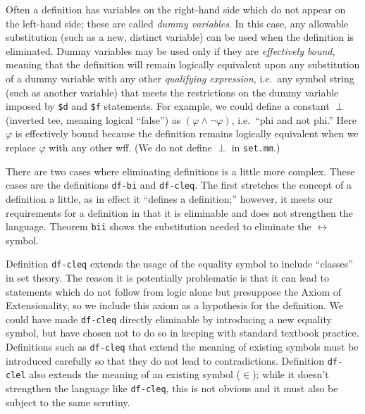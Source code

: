 Often a definition has variables on the right-hand side which do not appear on
the left-hand side; these are called {\em dummy variables}.  In this case, any
allowable substitution (such as a new, distinct
variable) can be used when the definition is eliminated.  Dummy variables may
be used only if they are {\em effectively bound}, meaning that the definition will remain logically equivalent upon
any substitution of a dummy variable with any other {\em qualifying
expression}, i.e.\ any symbol string (such as
another variable) that
meets the restrictions on the dummy variable imposed by \texttt{\$d} and
\texttt{\$f} statements.  For example, we could define a constant $\perp$
(inverted tee, meaning logical ``false'') as $( \varphi \wedge \lnot \varphi
)$, i.e.\ ``phi and not phi.''  Here $\varphi$ is effectively bound because the
definition remains logically equivalent when we replace $\varphi$ with any
other wff.  (We do not define $\perp$ in \texttt{set.mm}.)

There are two cases where eliminating definitions is a little more
complex.  These cases are the definitions \texttt{df-bi} and
\texttt{df-cleq}.  The first stretches the concept of a definition a
little, as in effect it ``defines a definition;'' however, it meets our
requirements for a definition in that it is eliminable and does not
strengthen the language.  Theorem \texttt{bii} shows the substitution
needed to eliminate the $\leftrightarrow$ symbol.

Definition \texttt{df-cleq} extends the usage of
the equality symbol to include ``classes'' in set theory.  The
reason it is potentially problematic is that it can lead to statements which
do not follow from logic alone but presuppose the Axiom of
Extensionality, so we include this axiom
as a hypothesis for the definition.  We could have made \texttt{df-cleq} directly
eliminable by introducing a new equality symbol, but have chosen not to do so
in keeping with standard textbook practice.  Definitions such as \texttt{df-cleq}
that extend the meaning of existing symbols must be introduced carefully so
that they do not lead to contradictions.  Definition \texttt{df-clel} also
extends the meaning of an existing symbol ($\in$); while it doesn't strengthen
the language like \texttt{df-cleq}, this is not obvious and it must also be
subject to the same scrutiny.

